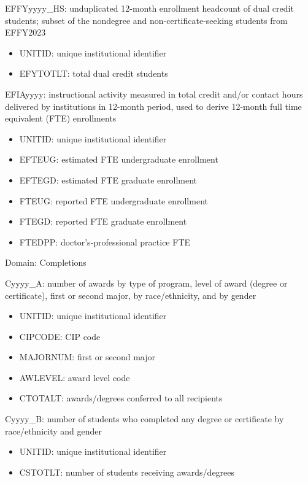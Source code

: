 \documentclass[sigconf, authorversion, nonacm]{acmart}
\begin{document}
    EFFYyyyy_HS: unduplicated 12-month enrollment headcount of dual credit students; subset of the nondegree and non-certificate-seeking students from EFFY2023

    \begin{itemize}
        \item UNITID: unique institutional identifier
        \item EFYTOTLT: total dual credit students
    \end{itemize}

    EFIAyyyy: instructional activity measured in total credit and/or contact hours delivered by institutions in 12-month period, used to derive 12-month full time equivalent (FTE) enrollments

    \begin{itemize}
        \item UNITID: unique institutional identifier
        \item EFTEUG: estimated FTE undergraduate enrollment
        \item EFTEGD: estimated FTE graduate enrollment
        \item FTEUG: reported FTE undergraduate enrollment
        \item FTEGD: reported FTE graduate enrollment
        \item FTEDPP: doctor's-professional practice FTE
    \end{itemize}

    Domain: Completions

    Cyyyy_A: number of awards by type of program, level of award (degree or certificate), first or second major, by race/ethnicity, and by gender

    \begin{itemize}
        \item UNITID: unique institutional identifier
        \item CIPCODE: CIP code
        \item MAJORNUM: first or second major
        \item AWLEVEL: award level code
        \item CTOTALT: awards/degrees conferred to all recipients
    \end{itemize}

    Cyyyy_B: number of students who completed any degree or certificate by race/ethnicity and gender

    \begin{itemize}
        \item UNITID: unique institutional identifier
        \item CSTOTLT: number of students receiving awards/degrees
    \end{itemize}
\end{document}
